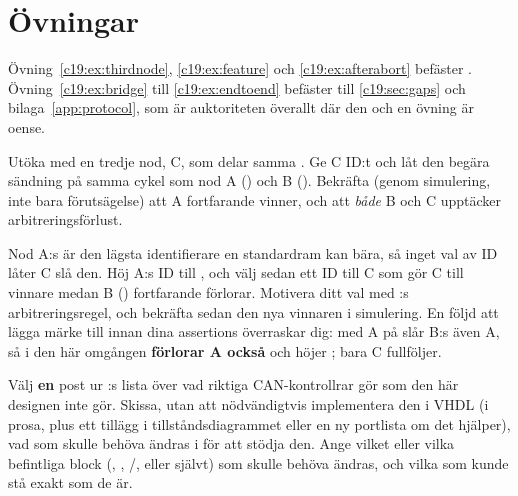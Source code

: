 
\section{Övningar}
\label{c19:sec:exercises}

\begin{aside}
Övning~\ref{c19:ex:thirdnode}, \ref{c19:ex:feature} och \ref{c19:ex:afterabort} befäster
. Övning~\ref{c19:ex:bridge} till \ref{c19:ex:endtoend} befäster
 till \ref{c19:sec:gaps} och bilaga~\ref{app:protocol}, som är auktoriteten
överallt där den och en övning är oense.
\end{aside}

\label{c19:ex:thirdnode}
 Utöka  med en tredje nod, C, som delar samma .
Ge C ID:t  och låt den begära sändning på samma cykel som nod A () och B
(). Bekräfta (genom simulering, inte bara förutsägelse) att A fortfarande vinner, och att
\emph{både} B och C upptäcker arbitreringsförlust.

 Nod A:s  är den lägsta identifierare en standardram kan bära, så inget val av
ID låter C slå den. Höj A:s ID till , och välj sedan ett ID till C som gör C till vinnare
medan B () fortfarande förlorar. Motivera ditt val med :s
arbitreringsregel, och bekräfta sedan den nya vinnaren i simulering. En följd att lägga märke till
innan dina assertions överraskar dig: med A på  slår B:s  även A, så i den
här omgången \textbf{förlorar A också} och höjer ; bara C fullföljer.

\label{c19:ex:feature}
Välj \textbf{en} post ur :s lista över vad riktiga CAN-kontrollrar gör som den
här designen inte gör. Skissa, utan att nödvändigtvis implementera den i VHDL (i prosa, plus ett
tillägg i tillståndsdiagrammet eller en ny portlista om det hjälper), vad som skulle behöva ändras i
 för att stödja den. Ange vilket eller vilka befintliga block
(, , /, eller
 självt) som skulle behöva ändras, och vilka som kunde stå exakt som de är.

